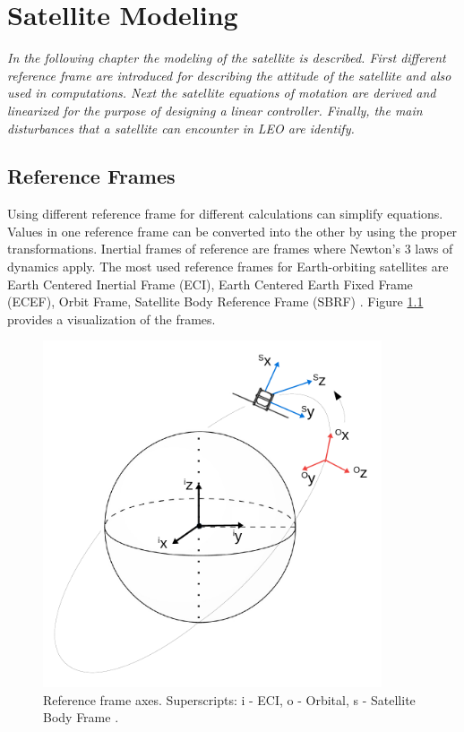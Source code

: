 \chapter{Satellite Modeling}
\textit{In the following chapter the modeling of the satellite is described. First different reference frame are introduced for describing the attitude of the satellite and also used in computations. Next the satellite equations of motation are derived and linearized for the purpose of designing a linear controller. Finally, the main disturbances that a satellite can encounter in LEO are identify.}

\section{Reference Frames}


Using different reference frame for different calculations can simplify equations. Values in one reference frame can be converted into the other by using the proper transformations.
Inertial frames of reference are frames where Newton's 3 laws of dynamics apply.
The most used reference frames for Earth-orbiting satellites are Earth Centered Inertial Frame (ECI), Earth Centered Earth Fixed Frame (ECEF), Orbit Frame, Satellite Body Reference Frame (SBRF)  \cite{ref1} \cite{ref2}. Figure \ref{fig:frames} provides a visualization of the frames.
\begin{figure}[H]
	\centering 
	\includegraphics[width=100mm]{figures/frame.pdf}	
	\caption{Reference frame axes. Superscripts: i - ECI, o - Orbital, s - Satellite Body Frame \cite{PrevPro}.}
	\label{fig:frames}
\end{figure}

